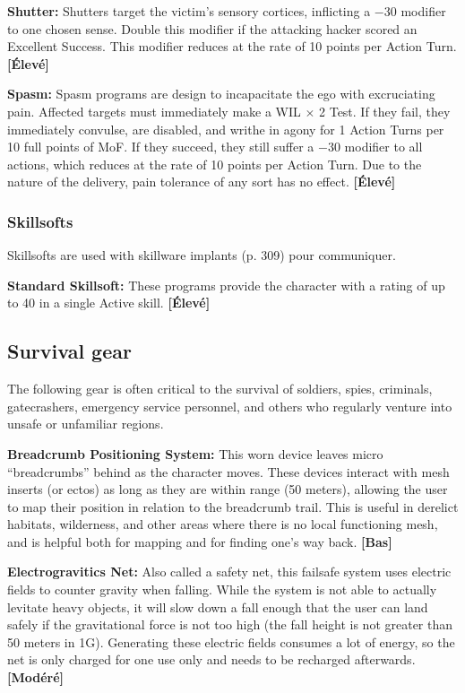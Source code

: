 {{\textbf{Shutter:} Shutters target the victim’s sensory cortices, inflicting a $-$30 modifier to one chosen sense. Double this modifier if the attacking hacker scored an Excellent Success. This modifier reduces at the rate of 10 points per Action Turn. \textbf{[Élevé]} 

\textbf{Spasm:} Spasm programs are design to incapacitate the ego with excruciating pain. Affected targets must immediately make a WIL $\times$ 2 Test. If they fail, they immediately convulse, are disabled, and writhe in agony for 1 Action Turns per 10 full points of MoF. If they succeed, they still suffer a $-$30 modifier to all actions, which reduces at the rate of 10 points per Action Turn. Due to the nature of the delivery, pain tolerance of any sort has no effect. \textbf{[Élevé]} 

\subsubsection{Skillsofts} 

Skillsofts are used with skillware implants (p. 309) pour communiquer. 

\textbf{Standard Skillsoft:} These programs provide the character with a rating of up to 40 in a single Active skill. \textbf{[Élevé]} 

\subsection{Survival gear} \label{sec:survival-gear} 

The following gear is often critical to the survival of soldiers, spies, criminals, gatecrashers, emergency service personnel, and others who regularly venture into unsafe or unfamiliar regions. 

\textbf{Breadcrumb Positioning System:} This worn device leaves micro ``breadcrumbs'' behind as the character moves. These devices interact with mesh inserts (or ectos) as long as they are within range (50 meters), allowing the user to map their position in relation to the breadcrumb trail. This is useful in derelict habitats, wilderness, and other areas where there is no local functioning mesh, and is helpful both for mapping and for finding one’s way back. \textbf{[Bas]} 

\textbf{Electrogravitics Net:} Also called a safety net, this failsafe system uses electric fields to counter gravity when falling. While the system is not able to actually levitate heavy objects, it will slow down a fall enough that the user can land safely if the gravitational force is not too high (the fall height is not greater than 50 meters in 1G). Generating these electric fields consumes a lot of energy, so the net is only charged for one use only and needs to be recharged afterwards. \textbf{[Modéré]} 

}}
